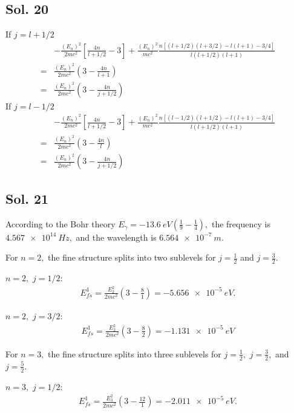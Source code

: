 \subsection*{Sol. 20}
If $j=l+1/2$
\begin{align*}
    &-\frac{(E_n)^2}{2mc^2}\left[
    \frac{4n}{l+1/2}-3
    \right] + 
    \frac{(E_n)^2}{mc^2}
    \frac{n[(l+1/2)(l+3/2)-l(l+1)-3/4]}{l(l+1/2)(l+1)}\\
    =&
    \frac{(E_n)^2}{2mc^2}
    \left(
    3-\frac{4n}{l+1}
    \right)\\
    =&\frac{(E_n)^2}{2mc^2}
    \left(
    3-\frac{4n}{j+1/2}
    \right)
\end{align*}
If $j=l-1/2$
\begin{align*}
    &-\frac{(E_n)^2}{2mc^2}\left[
    \frac{4n}{l+1/2}-3
    \right] + 
    \frac{(E_n)^2}{mc^2}
    \frac{n[(l-1/2)(l+1/2)-l(l+1)-3/4]}{l(l+1/2)(l+1)}\\
    =&
    \frac{(E_n)^2}{2mc^2}
    \left(
    3-\frac{4n}{l}
    \right)\\
    =&\frac{(E_n)^2}{2mc^2}
    \left(
    3-\frac{4n}{j+1/2}
    \right)
\end{align*}

\subsection*{Sol. 21}
According to the Bohr theory
$
E_\gamma = -\qty{13.6}{eV}(\frac{1}{9}-\frac{1}{4}),
$
the frequency is $\qty{4.567e14}{Hz},$ and the wavelength is $\qty{6.564e-7}{m}.$

For $n=2,$ the fine structure splits into two sublevels for $j=\frac{1}{2}$ and $j=\frac{3}{2}.$

$n=2,$ $j=1/2:$
\begin{align*}
    E^1_{fs} = \frac{E_2^2}{2mc^2}(3-\frac{8}{1})= -\qty{5.656e-5}{eV}.
\end{align*}

$n=2,$ $j=3/2:$
\begin{align*}
    E^1_{fs} = \frac{E_2^2}{2mc^2}(3-\frac{8}{2})=-\qty{1.131e-5}{eV}
\end{align*}

For $n=3,$ the fine structure splits into three sublevels for $j=\frac{1}{2},$  $j=\frac{3}{2},$ and $j=\frac{5}{2}.$

$n=3,$ $j=1/2:$
\begin{align*}
    E^1_{fs} = \frac{E_3^2}{2mc^2}(3-\frac{12}{1})= -\qty{2.011e-5}{eV}.
\end{align*}

